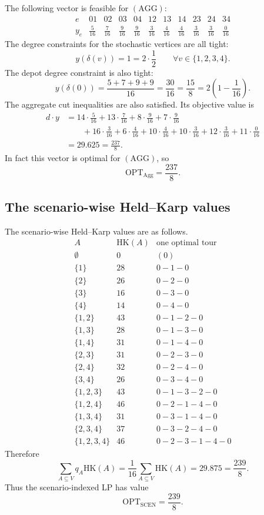 \documentclass[11pt]{article}
\newcommand{\HK}{\mathrm{HK}}
\newcommand{\OPT}{\mathrm{OPT}}
\newcommand{\Agg}{\mathrm{Agg}}
\begin{document}
The following vector is feasible for \((\mathrm{AGG})\):
\[
\begin{array}{c|cccccccccc}
e & 01&02&03&04&12&13&14&23&24&34\\
\hline
y_e
& \frac{5}{16}
& \frac{7}{16}
& \frac{9}{16}
& \frac{9}{16}
& \frac{3}{16}
& \frac{4}{16}
& \frac{4}{16}
& \frac{3}{16}
& \frac{3}{16}
& \frac{0}{16}
\end{array}
\]
The degree constraints for the stochastic vertices are all tight:
\[
y(\delta(v))=1=2\cdot \frac12
\qquad \forall v\in\{1,2,3,4\}.
\]
The depot degree constraint is also tight:
\[
y(\delta(0))
=\frac{5+7+9+9}{16}
=\frac{30}{16}
=\frac{15}{8}
=2\left(1-\frac1{16}\right).
\]
The aggregate cut inequalities are also satisfied. Its objective value is
\[
\begin{aligned}
d\cdot y
&=14\cdot\frac{5}{16}
+13\cdot\frac{7}{16}
+8\cdot\frac{9}{16}
+7\cdot\frac{9}{16} \\
&\qquad
+16\cdot\frac{3}{16}
+6\cdot\frac{4}{16}
+10\cdot\frac{4}{16}
+10\cdot\frac{3}{16}
+12\cdot\frac{3}{16}
+11\cdot\frac{0}{16} \\
&=29.625
=\frac{237}{8}.
\end{aligned}
\]
In fact this vector is optimal for \((\mathrm{AGG})\), so
\[
\OPT_{\Agg}=\frac{237}{8}.
\]

\subsection{The scenario-wise Held--Karp values}

The scenario-wise Held--Karp values are as follows.
\[
\begin{array}{c|c|c}
A & \HK(A) & \text{one optimal tour} \\
\hline
\emptyset & 0 & (0) \\
\{1\} & 28 & 0-1-0 \\
\{2\} & 26 & 0-2-0 \\
\{3\} & 16 & 0-3-0 \\
\{4\} & 14 & 0-4-0 \\
\{1,2\} & 43 & 0-1-2-0 \\
\{1,3\} & 28 & 0-1-3-0 \\
\{1,4\} & 31 & 0-1-4-0 \\
\{2,3\} & 31 & 0-2-3-0 \\
\{2,4\} & 32 & 0-2-4-0 \\
\{3,4\} & 26 & 0-3-4-0 \\
\{1,2,3\} & 43 & 0-1-3-2-0 \\
\{1,2,4\} & 46 & 0-2-1-4-0 \\
\{1,3,4\} & 31 & 0-3-1-4-0 \\
\{2,3,4\} & 37 & 0-3-2-4-0 \\
\{1,2,3,4\} & 46 & 0-2-3-1-4-0
\end{array}
\]
Therefore
\[
\sum_{A\subseteq V}q_A\HK(A)
=\frac1{16}\sum_{A\subseteq V}\HK(A)
=29.875
=\frac{239}{8}.
\]
Thus the scenario-indexed LP has value
\[
\OPT_{\mathrm{SCEN}}=\frac{239}{8}.
\]
\end{document}
